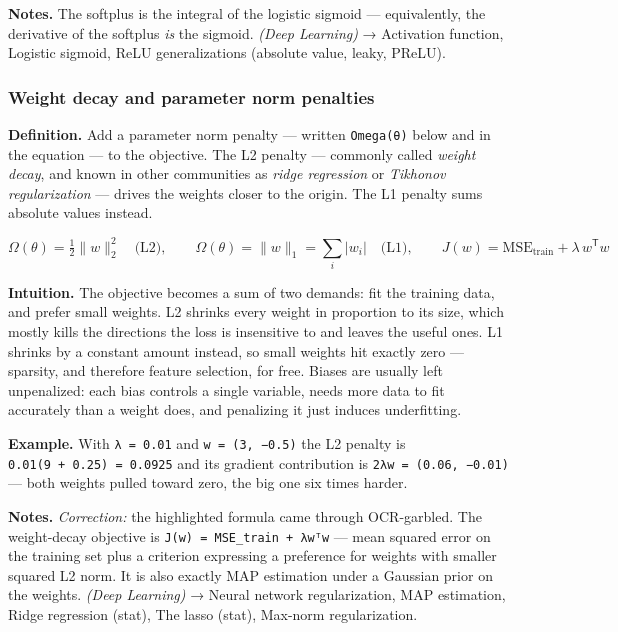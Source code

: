 \documentclass[
  10pt,
  letterpaper,
  onecolumn]{article}
\begin{document}
\textbf{Notes.} The softplus is the integral of the logistic sigmoid ---
equivalently, the derivative of the softplus \emph{is} the sigmoid. \emph{(Deep Learning)} →
Activation function, Logistic sigmoid, ReLU generalizations (absolute
value, leaky, PReLU).

\hypertarget{weight-decay-and-parameter-norm-penalties}{%
\subsubsection{Weight decay and parameter norm
penalties}\label{weight-decay-and-parameter-norm-penalties}}

\textbf{Definition.} Add a parameter norm penalty --- written
\texttt{Omega(θ)} below and in the equation --- to the objective. The L2 penalty --- commonly called \emph{weight decay}, and
known in other communities as \emph{ridge regression} or
\emph{Tikhonov regularization} --- drives the weights closer to the
origin. The L1 penalty sums absolute values instead.

\begin{equation*}
\Omega(\theta)=\tfrac{1}{2}\|w\|_2^{2}
\quad\text{(L2)},
\qquad
\Omega(\theta)=\|w\|_1=\sum_i|w_i|
\quad\text{(L1)},
\qquad
J(w)=\mathrm{MSE}_{\text{train}}+\lambda\, w^{\mathsf T}w
\end{equation*}

\textbf{Intuition.} The objective becomes a sum of two demands: fit the
training data, and prefer small weights. L2 shrinks every weight in
proportion to its size, which mostly kills the directions the loss is
insensitive to and leaves the useful ones. L1 shrinks by a constant
amount instead, so small weights hit exactly zero --- sparsity, and
therefore feature selection, for free. Biases are usually left
unpenalized: each bias controls a single variable, needs more data to
fit accurately than a weight does, and penalizing it just induces
underfitting.

\textbf{Example.} With \texttt{λ\ =\ 0.01} and
\texttt{w\ =\ (3,\ −0.5)} the L2 penalty is
\texttt{0.01(9\ +\ 0.25)\ =\ 0.0925} and its gradient contribution is
\texttt{2λw\ =\ (0.06,\ −0.01)} --- both weights pulled toward zero,
the big one six times harder.

\textbf{Notes.} \emph{Correction:} the highlighted formula came through
OCR-garbled. The weight-decay objective is
\texttt{J(w)\ =\ MSE\_train\ +\ λwᵀw} --- mean squared error on the
training set plus a criterion expressing a preference for weights with
smaller squared L2 norm. It is also exactly MAP estimation under a
Gaussian prior on the weights. \emph{(Deep Learning)} → Neural network
regularization, MAP estimation, Ridge regression (stat), The lasso
(stat), Max-norm regularization.
\end{document}
